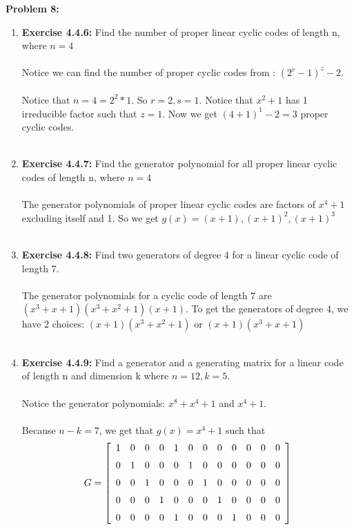 \documentclass[11pt]{article}
\newcommand{\spacer}{\noalign{\medskip}}
\newenvironment{problem}[1]{\textbf{Problem #1: }}{\newpage}
\begin{document}
	\begin{problem}{8}
		\begin{enumerate}[label = (\alph*)]
			\item \textbf{Exercise 4.4.6: } Find the number of proper linear cyclic codes of length n, where $n = 4$
			\\ \\
			Notice we can find the number of proper cyclic codes from : $(2^r - 1)^z - 2$.
			\\ \\
			Notice that $n = 4 = 2^2 * 1$.  So $r = 2, s = 1$.  Notice that $x^2 + 1$ has 1 irreducible factor such that $z = 1$.  Now we get $(4 + 1)^1 - 2 = 3$ proper cyclic codes.
			\\ \\
			\item \textbf{Exercise 4.4.7: } Find the generator polynomial for all proper linear cyclic codes of length n, where $n =  4$
			\\ \\
			The generator polynomials of proper linear cyclic codes are factors of $x^4 + 1$ excluding itself and 1.  So we get $g(x) = (x + 1), (x+1)^2, (x+1)^3$
			\\ \\
			\item \textbf{Exercise 4.4.8: } Find two generators of degree 4 for a linear cyclic code of length 7.
			\\ \\
			The generator polynomials for a cyclic code of length 7 are $ \left( {x}^{3}+x+1 \right)  \left( {x}^{3}+{x}^{2}+1\right)  \left( x+1 \right)$.  To get the generators of degree 4, we have 2 choices: $(x+1) \left( {x}^{3}+{x}^{2}+1\right)$ or $(x+1)\left( {x}^{3}+x+1 \right)$
			\\ \\
			\item \textbf{Exercise 4.4.9: } Find a generator and a  generating matrix for a linear code of length n and dimension k where $n = 12, k  = 5$.
			\\ \\
			Notice the generator polynomials: $x^8 + x^4 + 1$ and $x^4 + 1$. 
			\\ \\
			Because $n - k = 7$, we get that $g(x) = x^4 + 1$ such that 
			\[G = \left[\begin{array}{cccccccccccc}
				1 & 0 & 0 & 0 & 1 & 0 & 0 & 0 & 0 & 0 & 0 & 0 \\
				\spacer 0 & 1 & 0 & 0 & 0 & 1 & 0 & 0 & 0 & 0 & 0 & 0 \\
				\spacer0 & 0 & 1 & 0 & 0 & 0 & 1 & 0 & 0 & 0 & 0 & 0 \\
				\spacer0 & 0 & 0 & 1 & 0 & 0 & 0 & 1 & 0 & 0 & 0 & 0 \\
				\spacer0 & 0 & 0 & 0 & 1 & 0 & 0 & 0 & 1 & 0 & 0 & 0
			\end{array}\right]\]
		\end{enumerate}
	\end{problem}
\end{document}
